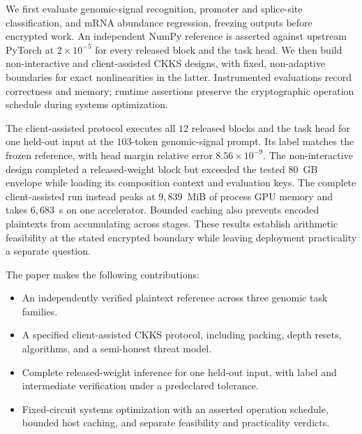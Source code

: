 We first evaluate genomic-signal recognition, promoter and splice-site classification, and mRNA
abundance regression, freezing outputs before encrypted work. An independent NumPy reference is
asserted against upstream PyTorch at $2\times10^{-5}$ for every released block and the task head.
We then build non-interactive and client-assisted CKKS designs, with fixed, non-adaptive boundaries
for exact nonlinearities in the latter. Instrumented evaluations record correctness and memory;
runtime assertions preserve the cryptographic operation schedule during systems optimization.

The client-assisted protocol executes all $12$ released blocks and the task head for one held-out
input at the $103$-token genomic-signal prompt. Its label matches the frozen reference, with head
margin relative error $8.56\times10^{-9}$. The non-interactive design completed a released-weight
block but exceeded the tested $80$~GB envelope while loading its composition context and evaluation
keys. The complete client-assisted run instead peaks at $9{,}839$~MiB of process GPU memory and
takes $6{,}683$~s on one accelerator. Bounded caching also prevents encoded plaintexts from
accumulating across stages. These results establish arithmetic feasibility at the stated encrypted
boundary while leaving deployment practicality a separate question.

The paper makes the following contributions:

\begin{itemize}
  \item An independently verified plaintext reference across three genomic task families.
  \item A specified client-assisted CKKS protocol, including packing, depth resets, algorithms,
        and a semi-honest threat model.
  \item Complete released-weight inference for one held-out input, with label and intermediate
        verification under a predeclared tolerance.
  \item Fixed-circuit systems optimization with an asserted operation schedule, bounded host
        caching, and separate feasibility and practicality verdicts.
\end{itemize}
